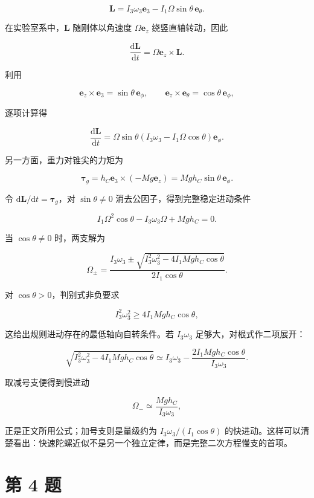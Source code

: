 \documentclass[12pt,a4paper,UTF8]{ctexart}
\begin{document}
\[
\boldsymbol L
=I_3\omega_3\boldsymbol e_3
-I_1\Omega\sin\theta\,\boldsymbol e_\theta.
\]

在实验室系中，\(\boldsymbol L\) 随刚体以角速度 \(\Omega\boldsymbol e_z\)
绕竖直轴转动，因此

\[
\frac{\mathrm d\boldsymbol L}{\mathrm dt}
=\Omega\boldsymbol e_z\times\boldsymbol L.
\]

利用

\[
\boldsymbol e_z\times\boldsymbol e_3
=\sin\theta\,\boldsymbol e_\phi,
\qquad
\boldsymbol e_z\times\boldsymbol e_\theta
=\cos\theta\,\boldsymbol e_\phi,
\]

逐项计算得

\[
\frac{\mathrm d\boldsymbol L}{\mathrm dt}
=\Omega\sin\theta
\left(I_3\omega_3-I_1\Omega\cos\theta\right)
\boldsymbol e_\phi.
\]

另一方面，重力对锥尖的力矩为

\[
\boldsymbol\tau_g
=h_C\boldsymbol e_3\times(-Mg\boldsymbol e_z)
=Mgh_C\sin\theta\,\boldsymbol e_\phi.
\]

令 \(\mathrm d\boldsymbol L/\mathrm dt=\boldsymbol\tau_g\)，对
\(\sin\theta\ne0\) 消去公因子，得到完整稳定进动条件

\[
\boxed{
I_1\Omega^2\cos\theta-I_3\omega_3\Omega+Mgh_C=0
}.
\]

当 \(\cos\theta\ne0\) 时，两支解为

\[
\boxed{
\Omega_\pm
=\frac{I_3\omega_3\pm
\sqrt{I_3^2\omega_3^2-4I_1Mgh_C\cos\theta}}
{2I_1\cos\theta}
}.
\]

对 \(\cos\theta>0\)，判别式非负要求

\[
I_3^2\omega_3^2
\ge4I_1Mgh_C\cos\theta,
\]

这给出规则进动存在的最低轴向自转条件。若 \(I_3\omega_3\)
足够大，对根式作二项展开：

\[
\sqrt{I_3^2\omega_3^2-4I_1Mgh_C\cos\theta}
\simeq I_3\omega_3
-\frac{2I_1Mgh_C\cos\theta}{I_3\omega_3}.
\]

取减号支便得到慢进动

\[
\Omega_-
\simeq\frac{Mgh_C}{I_3\omega_3},
\]

正是正文所用公式；加号支则是量级约为 \(I_3\omega_3/(I_1\cos\theta)\)
的快进动。这样可以清楚看出：快速陀螺近似不是另一个独立定律，而是完整二次方程慢支的首项。

\newpage

\section{第 4 题}\label{ux7b2c-4-ux9898}
\end{document}
